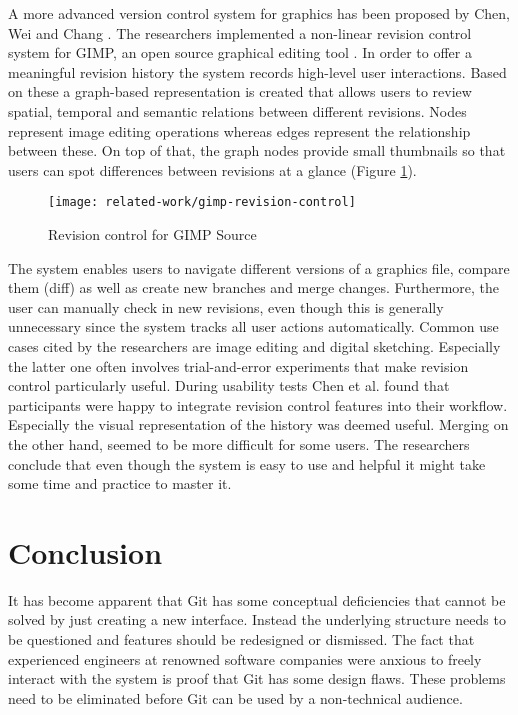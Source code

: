 A more advanced version control system for graphics has been proposed by Chen, Wei and Chang \cite{chen_nonlinear_2011}. The researchers implemented a non-linear revision control system for GIMP, an open source graphical editing tool \cite{_gimp_????}. In order to offer a meaningful revision history the system records high-level user interactions. Based on these a graph-based representation is created that allows users to review spatial, temporal and semantic relations between different revisions. Nodes represent image editing operations whereas edges represent the relationship between these. On top of that, the graph nodes provide small thumbnails so that users can spot differences between revisions at a glance (Figure \ref{fig:gimp-rev-control}).

\begin{figure}[h!]
 \centering
 \texttt{[image: related-work/gimp-revision-control]}
 \caption{Revision control for GIMP Source}
 \label{fig:gimp-rev-control}
\end{figure}


The system enables users to navigate different versions of a graphics file, compare them (diff) as well as create new branches and merge changes. Furthermore, the user can manually check in new revisions, even though this is generally unnecessary since the system tracks all user actions automatically. Common use cases cited by the researchers are image editing and digital sketching. Especially the latter one often involves trial-and-error experiments that make revision control particularly useful. During usability tests Chen et al. found that participants were happy to integrate revision control features into their workflow. Especially the visual representation of the history was deemed useful. Merging on the other hand, seemed to be more difficult for some users. The researchers conclude that even though the system is easy to use and helpful it might take some time and practice to master it.

\section{Conclusion}
It has become apparent that Git has some conceptual deficiencies that cannot be solved by just creating a new interface. Instead the underlying structure needs to be questioned and features should be redesigned or dismissed. The fact that experienced engineers at renowned software companies were anxious to freely interact with the system is proof that Git has some design flaws. These problems need to be eliminated before Git can be used by a non-technical audience.


